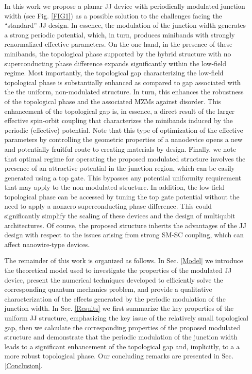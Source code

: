 \documentclass[twocolumn,aps,prb,nofootinbib]{revtex4-2}
\begin{document}
In this work we propose a planar JJ device  with periodically modulated junction  width (see Fig. \ref{FIG1}) as a possible solution to the challenges facing the ``standard'' JJ design. In essence, the modulation of the junction width generates a strong periodic potential, which, in turn, produces minibands with strongly renormalized effective parameters. On the one hand, in the presence of these minibands, the  topological phase supported by the hybrid structure with no superconducting phase difference expands significantly within the low-field regime.  Most importantly, the topological gap characterizing the low-field topological phase is substantially enhanced as compared to gap associated with the the uniform, non-modulated structure. In turn, this enhances the robustness of the topological phase and the associated MZMs against disorder. This enhancement of the topological gap is, in essence, a direct result of the larger effective spin-orbit coupling that characterizes the minibands induced by the periodic (effective) potential. Note that this type of optimization of the effective parameters by controlling the geometric properties of a nanodevice opens a new and potentially fruitful route to creating materials by design. Finally, we note that optimal regime for operating the proposed modulated structure involves the presence of an attractive potential in the junction region, which can be easily generated using a top gate. This bypasses any potential uniformity requirement that may apply to the non-modulated structure. In addition, the low-field topological phase can be accessed by tuning the top gate potential without the need to apply a nonzero superconducting phase difference. This could significantly simplify the scaling of these devices and the design of multiqubit architectures. Of course, the proposed structure inherits the advantages of the JJ design with respect to the issues  arising from strong SM-SC coupling, which can affect nanowire-type devices.

The remainder of this work is organized as follows. In Sec. \ref{Model} we introduce the theoretical model used to investigate the properties of the modulated JJ device, present the numerical techniques developed to efficiently solve the corresponding quantum mechanics problem, and provide a qualitative characterization of the effects generated by the periodic modulation of the junction width. In Sec. \ref{Results} we first summarize the key properties of the uniform JJ structure, emphasizing the key issue of the relatively small topological gap, then we calculate the corresponding properties of the proposed modulated structure and demonstrate that the periodic modulation of the junction width leads to a significant enhancement of the topological gap and, implicitly, to a a more robust topological phase.  Our concluding remarks are presented in Sec. \ref{Conclusion}.
\end{document}
